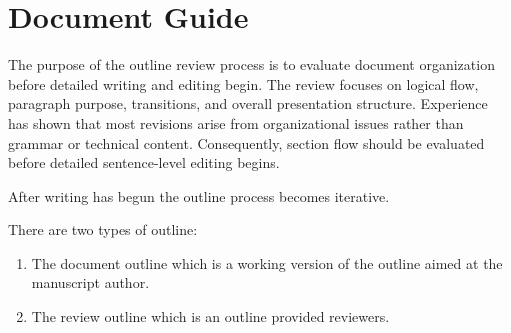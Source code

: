 \newpage
\section{Document Guide}
The purpose of the outline review process is to evaluate document
organization before detailed writing and editing begin. The review
focuses on logical flow, paragraph purpose, transitions, and overall
presentation structure. Experience has shown that most revisions arise
from organizational issues rather than grammar or technical content.
Consequently, section flow should be evaluated before detailed
sentence-level editing begins.

After writing has begun the outline process becomes iterative.

There are two types of outline:

\begin{enumerate}
\item The document outline which is a working version of the outline aimed at the manuscript author.
\item The review outline which is an outline provided reviewers.
\end{enumerate}

